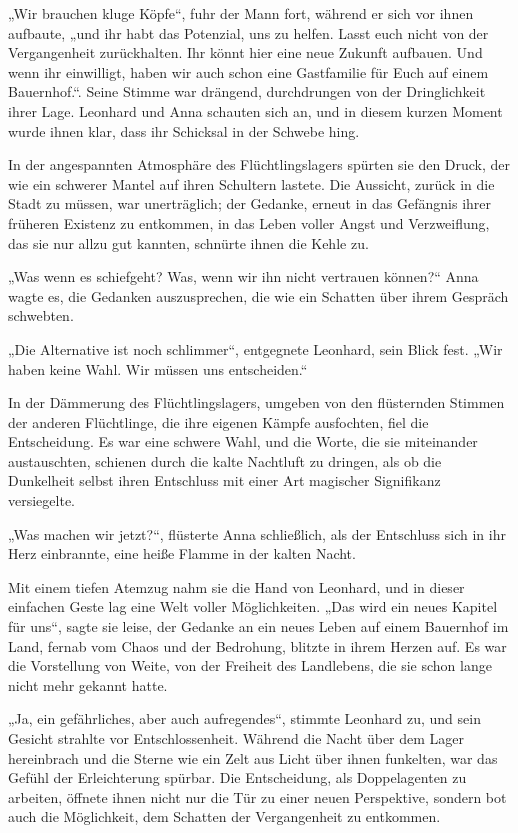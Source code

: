 \documentclass[
]{article}
\begin{document}
„Wir brauchen kluge Köpfe``, fuhr der Mann fort, während er sich vor
ihnen aufbaute, „und ihr habt das Potenzial, uns zu helfen. Lasst euch
nicht von der Vergangenheit zurückhalten. Ihr könnt hier eine neue
Zukunft aufbauen. Und wenn ihr einwilligt, haben wir auch schon eine
Gastfamilie für Euch auf einem Bauernhof.``. Seine Stimme war drängend,
durchdrungen von der Dringlichkeit ihrer Lage. Leonhard und Anna
schauten sich an, und in diesem kurzen Moment wurde ihnen klar, dass ihr
Schicksal in der Schwebe hing.

In der angespannten Atmosphäre des Flüchtlingslagers spürten sie den
Druck, der wie ein schwerer Mantel auf ihren Schultern lastete. Die
Aussicht, zurück in die Stadt zu müssen, war unerträglich; der Gedanke,
erneut in das Gefängnis ihrer früheren Existenz zu entkommen, in das
Leben voller Angst und Verzweiflung, das sie nur allzu gut kannten,
schnürte ihnen die Kehle zu.

„Was wenn es schiefgeht? Was, wenn wir ihn nicht vertrauen
können?{\kern0pt}`` Anna wagte es, die Gedanken auszusprechen, die wie
ein Schatten über ihrem Gespräch schwebten.

„Die Alternative ist noch schlimmer``, entgegnete Leonhard, sein Blick
fest. „Wir haben keine Wahl. Wir müssen uns entscheiden.``

In der Dämmerung des Flüchtlingslagers, umgeben von den flüsternden
Stimmen der anderen Flüchtlinge, die ihre eigenen Kämpfe ausfochten,
fiel die Entscheidung. Es war eine schwere Wahl, und die Worte, die sie
miteinander austauschten, schienen durch die kalte Nachtluft zu dringen,
als ob die Dunkelheit selbst ihren Entschluss mit einer Art magischer
Signifikanz versiegelte.

„Was machen wir jetzt?{\kern0pt}``, flüsterte Anna schließlich, als der
Entschluss sich in ihr Herz einbrannte, eine heiße Flamme in der kalten
Nacht.

Mit einem tiefen Atemzug nahm sie die Hand von Leonhard, und in dieser
einfachen Geste lag eine Welt voller Möglichkeiten. „Das wird ein neues
Kapitel für uns``, sagte sie leise, der Gedanke an ein neues Leben auf
einem Bauernhof im Land, fernab vom Chaos und der Bedrohung, blitzte in
ihrem Herzen auf. Es war die Vorstellung von Weite, von der Freiheit des
Landlebens, die sie schon lange nicht mehr gekannt hatte.

„Ja, ein gefährliches, aber auch aufregendes``, stimmte Leonhard zu, und
sein Gesicht strahlte vor Entschlossenheit. Während die Nacht über dem
Lager hereinbrach und die Sterne wie ein Zelt aus Licht über ihnen
funkelten, war das Gefühl der Erleichterung spürbar. Die Entscheidung,
als Doppelagenten zu arbeiten, öffnete ihnen nicht nur die Tür zu einer
neuen Perspektive, sondern bot auch die Möglichkeit, dem Schatten der
Vergangenheit zu entkommen.
\end{document}
